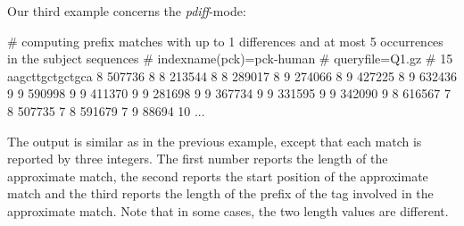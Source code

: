 \documentclass[12pt]{article}
\begin{document}
Our third example concerns the \textit{pdiff}-mode:

\begin{Output}
# computing prefix matches with up to 1 differences and at most 5 occurrences in the subject sequences
# indexname(pck)=pck-human
# queryfile=Q1.gz
# 15 aagcttgctgctgca
8 507736 8
8 213544 8
8 289017 8
9 274066 8
9 427225 8
9 632436 9
9 590998 9
9 411370 9
9 281698 9
9 367734 9
9 331595 9
9 342090 9
8 616567 7
8 507735 7
8 591679 7
9 88694 10
...
\end{Output}

The output is similar as in the previous example, except that each match
is reported by three integers. The first number reports the length of the
approximate match, the second reports the start position of the approximate
match and the third reports the length of the prefix of the tag
involved in the approximate match. Note that in some cases,
the two length values are different.
\end{document}
